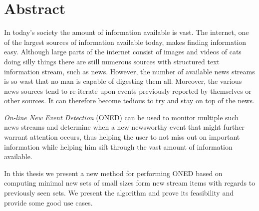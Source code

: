 \chapter*{Abstract}
\label{chapter:abstract}
In today's society the amount of information available is vast. The internet, one of the largest sources of information available today, makes finding information easy. Although large parts of the internet consist of images and videos of cats doing silly things there are still numerous sources with structured text information stream, such as news. However, the number of available news streams is so wast that no man is capable of digesting them all. Moreover, the various news sources tend to re-iterate upon events previously reported by themselves or other sources. It can therefore become tedious to try and stay on top of the news. 

\emph{On-line New Event Detection} (ONED) can be used to monitor multiple such news streams and determine when a new newsworthy event that might further warrant attention occurs, thus helping the user to not miss out on important information while helping him sift through the vast amount of information available.

In this thesis we present a new method for performing ONED based on computing minimal new sets of small sizes form new stream items with regards to previously seen sets. We present the algorithm and prove its feasibility and provide some good use cases.
